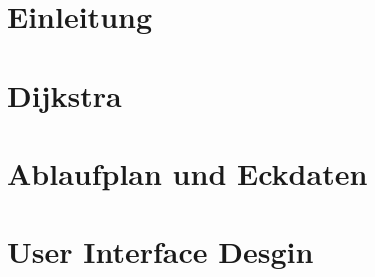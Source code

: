 







%

\newpage

\hypersetup{linkcolor=black}

\setcounter{secnumdepth}{5} 
\setcounter{tocdepth}{5} 
\tableofcontents
\restoregeometry
\newpage

\chapter{Einleitung}

\chapter{Dijkstra}

\chapter{Ablaufplan und Eckdaten}

\chapter{User Interface Desgin}




%
%

%

\newpage
\listoffigures
\newpage

%
%
